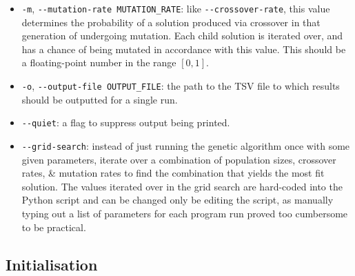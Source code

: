 \documentclass[a4paper]{article}
\begin{document}
\begin{itemize}
    \item   \verb|-m|, \verb|--mutation-rate MUTATION_RATE|: like \verb|--crossover-rate|, this value determines the probability of a solution produced via crossover in that generation of undergoing mutation.
            Each child solution is iterated over, and has a chance of being mutated in accordance with this value.
            This should be a floating-point number in the range $[0, 1]$.

    \item   \verb|-o|, \verb|--output-file OUTPUT_FILE|: the path to the TSV file to which results should be outputted for a single run.

    \item   \verb|--quiet|: a flag to suppress output being printed.

    \item   \verb|--grid-search|: instead of just running the genetic algorithm once with some given parameters, iterate over a combination of population sizes, crossover rates, \& mutation rates to find the combination that yields the most fit solution.
            The values iterated over in the grid search are hard-coded into the Python script and can be changed only be editing the script, as manually typing out a list of parameters for each program run proved too cumbersome to be practical.
\end{itemize}

\subsection{Initialisation}
\end{document}
